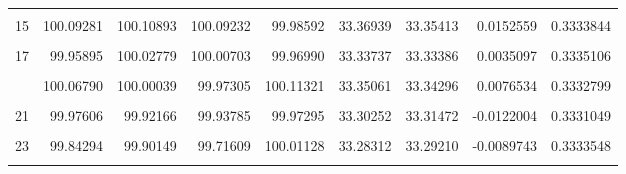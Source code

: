 \documentclass[a4paper]{tufte-handout}
\begin{document}
\begin{table}
{\begin{tabular}[t]{rrrrrrrrr}
\addlinespace
\cellcolor{gray!6}{14} & \cellcolor{gray!6}{100.01183} & \cellcolor{gray!6}{100.01245} & \cellcolor{gray!6}{100.00605} & \cellcolor{gray!6}{99.98231} & \cellcolor{gray!6}{33.31892} & \cellcolor{gray!6}{33.33342} & \cellcolor{gray!6}{-0.0145007} & \cellcolor{gray!6}{0.3331498}\\
15 & 100.09281 & 100.10893 & 100.09232 & 99.98592 & 33.36939 & 33.35413 & 0.0152559 & 0.3333844\\
\cellcolor{gray!6}{16} & \cellcolor{gray!6}{99.98783} & \cellcolor{gray!6}{99.87088} & \cellcolor{gray!6}{99.97196} & \cellcolor{gray!6}{99.98309} & \cellcolor{gray!6}{33.30840} & \cellcolor{gray!6}{33.31399} & \cellcolor{gray!6}{-0.0055924} & \cellcolor{gray!6}{0.3331245}\\
17 & 99.95895 & 100.02779 & 100.00703 & 99.96990 & 33.33737 & 33.33386 & 0.0035097 & 0.3335106\\
\cellcolor{gray!6}{18} & \cellcolor{gray!6}{99.97938} & \cellcolor{gray!6}{99.92114} & \cellcolor{gray!6}{99.96560} & \cellcolor{gray!6}{99.97708} & \cellcolor{gray!6}{33.30683} & \cellcolor{gray!6}{33.31820} & \cellcolor{gray!6}{-0.0113705} & \cellcolor{gray!6}{0.3331370}\\
\addlinespace
19 & 100.06790 & 100.00039 & 99.97305 & 100.11321 & 33.35061 & 33.34296 & 0.0076534 & 0.3332799\\
\cellcolor{gray!6}{20} & \cellcolor{gray!6}{100.10186} & \cellcolor{gray!6}{100.05983} & \cellcolor{gray!6}{100.10586} & \cellcolor{gray!6}{100.10155} & \cellcolor{gray!6}{33.37596} & \cellcolor{gray!6}{33.36303} & \cellcolor{gray!6}{0.0129313} & \cellcolor{gray!6}{0.3334200}\\
21 & 99.97606 & 99.92166 & 99.93785 & 99.97295 & 33.30252 & 33.31472 & -0.0122004 & 0.3331049\\
\cellcolor{gray!6}{22} & \cellcolor{gray!6}{100.06831} & \cellcolor{gray!6}{100.04468} & \cellcolor{gray!6}{100.06287} & \cellcolor{gray!6}{99.99709} & \cellcolor{gray!6}{33.34573} & \cellcolor{gray!6}{33.34496} & \cellcolor{gray!6}{0.0007739} & \cellcolor{gray!6}{0.3332297}\\
23 & 99.84294 & 99.90149 & 99.71609 & 100.01128 & 33.28312 & 33.29210 & -0.0089743 & 0.3333548\\
\addlinespace
\cellcolor{gray!6}{24} & \cellcolor{gray!6}{100.06130} & \cellcolor{gray!6}{100.12195} & \cellcolor{gray!6}{100.07985} & \cellcolor{gray!6}{100.11951} & \cellcolor{gray!6}{33.33344} & \cellcolor{gray!6}{33.36903} & \cellcolor{gray!6}{-0.0355897} & \cellcolor{gray!6}{0.3331302}\\

\end{tabular}}
\end{table}
\end{document}

